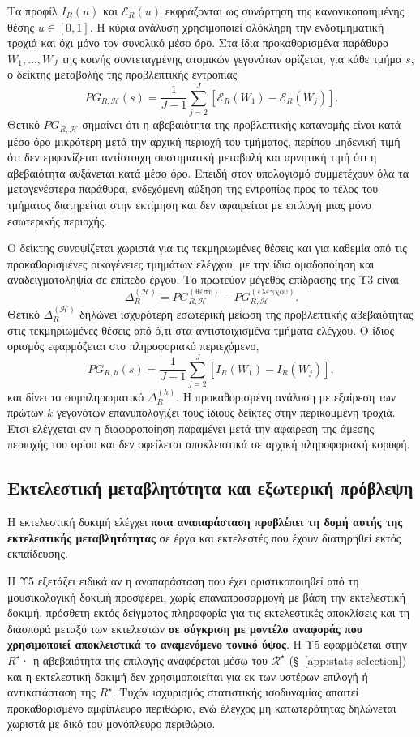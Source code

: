 \documentclass[11pt,a4paper]{article}
\begin{document}
Τα προφίλ \(I_R(u)\) και \(\mathcal{E}_R(u)\) εκφράζονται ως συνάρτηση της κανονικοποιημένης θέσης \(u\in[0,1]\). Η κύρια ανάλυση χρησιμοποιεί ολόκληρη την ενδοτμηματική τροχιά και όχι μόνο τον συνολικό μέσο όρο. Στα ίδια προκαθορισμένα παράθυρα \(W_1,\ldots,W_J\) της κοινής συντεταγμένης ατομικών γεγονότων ορίζεται, για κάθε τμήμα \(s\), ο δείκτης μεταβολής της προβλεπτικής εντροπίας
\[
PG_{R,\mathcal H}(s)
=
\frac{1}{J-1}
\sum_{j=2}^{J}
\left[
\mathcal E_R(W_1)-\mathcal E_R(W_j)
\right].
\]
Θετικό \(PG_{R,\mathcal H}\) σημαίνει ότι η αβεβαιότητα της προβλεπτικής κατανομής είναι κατά μέσο όρο μικρότερη μετά την αρχική περιοχή του τμήματος, περίπου μηδενική τιμή ότι δεν εμφανίζεται αντίστοιχη συστηματική μεταβολή και αρνητική τιμή ότι η αβεβαιότητα αυξάνεται κατά μέσο όρο. Επειδή στον υπολογισμό συμμετέχουν όλα τα μεταγενέστερα παράθυρα, ενδεχόμενη αύξηση της εντροπίας προς το τέλος του τμήματος διατηρείται στην εκτίμηση και δεν αφαιρείται με επιλογή μιας μόνο εσωτερικής περιοχής.

Ο δείκτης συνοψίζεται χωριστά για τις τεκμηριωμένες θέσεις και για καθεμία από τις προκαθορισμένες οικογένειες τμημάτων ελέγχου, με την ίδια ομαδοποίηση και αναδειγματοληψία σε επίπεδο έργου. Το πρωτεύον μέγεθος επίδρασης της Υ3 είναι
\[
\Delta_R^{(\mathcal H)}=
PG_{R,\mathcal H}^{(\text{θέση})}-PG_{R,\mathcal H}^{(\text{ελέγχου})}.
\]
Θετικό \(\Delta_R^{(\mathcal H)}\) δηλώνει ισχυρότερη εσωτερική μείωση της προβλεπτικής αβεβαιότητας στις τεκμηριωμένες θέσεις από ό,τι στα αντιστοιχισμένα τμήματα ελέγχου. Ο ίδιος ορισμός εφαρμόζεται στο πληροφοριακό περιεχόμενο,
\[
PG_{R,h}(s)
=
\frac{1}{J-1}
\sum_{j=2}^{J}
\left[
I_R(W_1)-I_R(W_j)
\right],
\]
και δίνει το συμπληρωματικό \(\Delta_R^{(h)}\). Η προκαθορισμένη ανάλυση με εξαίρεση των πρώτων \(k\) γεγονότων επανυπολογίζει τους ίδιους δείκτες στην περικομμένη τροχιά. Έτσι ελέγχεται αν η διαφοροποίηση παραμένει μετά την αφαίρεση της άμεσης περιοχής του ορίου και δεν οφείλεται αποκλειστικά σε αρχική πληροφοριακή κορυφή.

\subsection{Εκτελεστική μεταβλητότητα και εξωτερική πρόβλεψη}\label{app:stats-performance}

Η εκτελεστική δοκιμή ελέγχει \textbf{ποια αναπαράσταση προβλέπει τη δομή αυτής της εκτελεστικής μεταβλητότητας} σε έργα και εκτελεστές που έχουν διατηρηθεί εκτός εκπαίδευσης.

Η Υ5 εξετάζει ειδικά αν η αναπαράσταση που έχει οριστικοποιηθεί από τη μουσικολογική δοκιμή προσφέρει, χωρίς επαναπροσαρμογή με βάση την εκτελεστική δοκιμή, πρόσθετη εκτός δείγματος πληροφορία για τις εκτελεστικές αποκλίσεις και τη διασπορά μεταξύ των εκτελεστών \textbf{σε σύγκριση με μοντέλο αναφοράς που χρησιμοποιεί αποκλειστικά το αναμενόμενο τονικό ύψος}. Η Υ5 εφαρμόζεται στην $R^\star$· η αβεβαιότητα της επιλογής αναφέρεται μέσω του $\mathcal R^\star$ (§~\ref{app:stats-selection}) και η εκτελεστική δοκιμή δεν χρησιμοποιείται για εκ των υστέρων επιλογή ή αντικατάσταση της $R^\star$. Τυχόν ισχυρισμός στατιστικής ισοδυναμίας απαιτεί προκαθορισμένο αμφίπλευρο περιθώριο, ενώ έλεγχος μη κατωτερότητας δηλώνεται χωριστά με δικό του μονόπλευρο περιθώριο.
\end{document}
